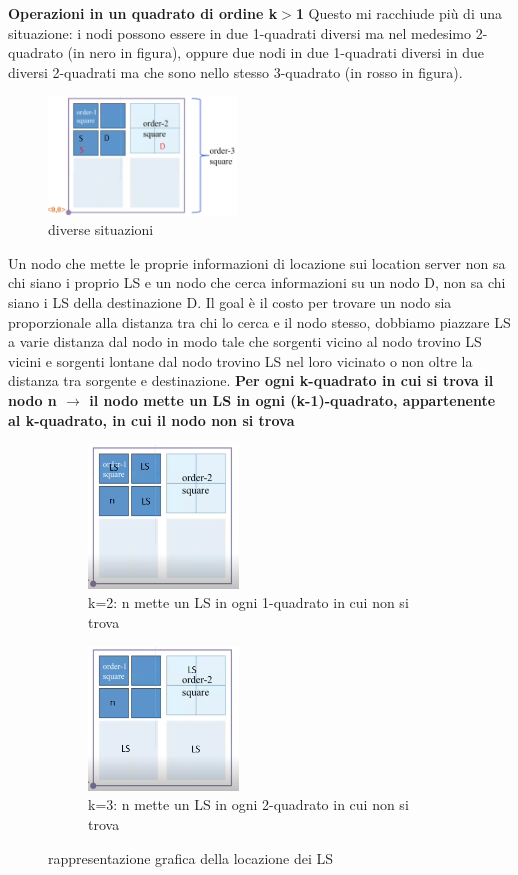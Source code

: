 \documentclass[12pt,italian]{report}
\begin{document}
\noindent \textbf{Operazioni in un quadrato di ordine k$>$1} 
\bigbreak
 Questo mi racchiude più di una situazione: i nodi possono essere in due 1-quadrati diversi ma nel medesimo 2-quadrato (in nero in figura), oppure due nodi in due 1-quadrati diversi in due diversi 2-quadrati ma che sono nello stesso 3-quadrato (in rosso in figura).
\begin{figure}[h]
\centering
\includegraphics[width=50mm]{img/gergridmod.PNG}
\caption{diverse situazioni}
\label{fig:home}
\end{figure}
Un nodo che mette le proprie informazioni di locazione sui location server non sa chi siano i proprio LS e un nodo che cerca informazioni su un nodo D, non sa chi siano i LS della destinazione D. 
\bigbreak
Il goal è il costo per trovare un nodo sia proporzionale alla distanza tra chi lo cerca e il nodo stesso, dobbiamo piazzare LS a varie distanza dal nodo in modo tale che sorgenti vicino al nodo trovino LS vicini e sorgenti lontane dal nodo trovino LS nel loro vicinato o non oltre la distanza tra sorgente e destinazione.
\bigbreak
\noindent \textbf{Per ogni k-quadrato in cui si trova il nodo n $\longrightarrow$ il nodo mette un LS in ogni (k-1)-quadrato, appartenente al k-quadrato, in cui il nodo non si trova}
\begin{figure}[h]
     \centering
     \begin{subfigure}[b]{0.4\textwidth}
         \centering
         \includegraphics[width=40mm]{img/gridgerls2.PNG}
         \caption{k=2: n mette un LS in ogni 1-quadrato in cui non si trova}
     \end{subfigure}
     \hfill
     \begin{subfigure}[b]{0.4\textwidth}
         \centering
          \includegraphics[width=40mm]{img/gridgerls3.PNG}
          \caption{k=3: n mette un LS in ogni 2-quadrato in cui non si trova}
     \end{subfigure}
    \caption{rappresentazione grafica della locazione dei LS}
    \label{fig:gewgnmer}
\end{figure}
\end{document}
